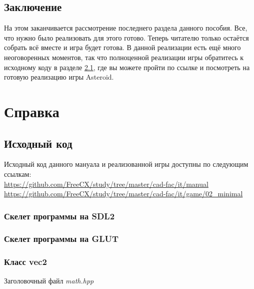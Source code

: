 \section{Заключение}
На этом заканчивается рассмотрение последнего раздела данного пособия. Все, что нужно было реализовать для 
этого готово. Теперь читателю только остаётся собрать всё вместе и игра будет готова. В данной реализации 
есть ещё много неоговоренных моментов, так что полноценной реализации игры обратитесь к исходному коду в 
разделе \ref{source:code}, где вы можете пройти по ссылке и посмотреть на готовую реализацию игры Asteroid.

\chapter{Справка}

\section{Исходный код}
\label{source:code}
Исходный код данного мануала и реализованной игры доступны по следующим ссылкам:\\
\url{https://github.com/FreeCX/study/tree/master/cad-fac/it/manual}\\
\url{https://github.com/FreeCX/study/tree/master/cad-fac/it/game/02_minimal}

\subsection{Скелет программы на SDL2}
\label{code:skeletonSDL2}


\pagebreak

\subsection{Скелет программы на GLUT}
\label{code:skeletonGLUT}


\pagebreak

\subsection{Класс vec2}
\label{code:vec2}
\begin{center}
    Заголовочный файл \emph{math.hpp}
\end{center}


